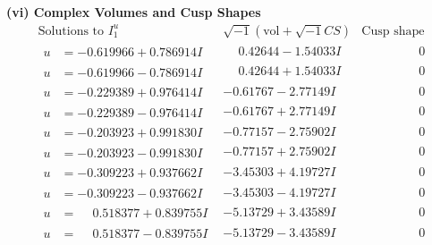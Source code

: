 \documentclass[1p]{elsarticle_modified}
\theoremstyle{definition}
\newcommand{\I}{\sqrt{-1}}
\begin{document}
\newpage\flushleft \textbf{(vi) Complex Volumes and Cusp Shapes}
$$\begin{array}{c|c|c}  
\text{Solutions to }I^u_{1}& \I (\text{vol} + \sqrt{-1}CS) & \text{Cusp shape}\\
 \hline 
\begin{aligned}
u &= -0.619966 + 0.786914 I\end{aligned}
 & \phantom{-}0.42644 - 1.54033 I & \phantom{-0.000000 } 0 \\ \hline\begin{aligned}
u &= -0.619966 - 0.786914 I\end{aligned}
 & \phantom{-}0.42644 + 1.54033 I & \phantom{-0.000000 } 0 \\ \hline\begin{aligned}
u &= -0.229389 + 0.976414 I\end{aligned}
 & -0.61767 - 2.77149 I & \phantom{-0.000000 } 0 \\ \hline\begin{aligned}
u &= -0.229389 - 0.976414 I\end{aligned}
 & -0.61767 + 2.77149 I & \phantom{-0.000000 } 0 \\ \hline\begin{aligned}
u &= -0.203923 + 0.991830 I\end{aligned}
 & -0.77157 - 2.75902 I & \phantom{-0.000000 } 0 \\ \hline\begin{aligned}
u &= -0.203923 - 0.991830 I\end{aligned}
 & -0.77157 + 2.75902 I & \phantom{-0.000000 } 0 \\ \hline\begin{aligned}
u &= -0.309223 + 0.937662 I\end{aligned}
 & -3.45303 + 4.19727 I & \phantom{-0.000000 } 0 \\ \hline\begin{aligned}
u &= -0.309223 - 0.937662 I\end{aligned}
 & -3.45303 - 4.19727 I & \phantom{-0.000000 } 0 \\ \hline\begin{aligned}
u &= \phantom{-}0.518377 + 0.839755 I\end{aligned}
 & -5.13729 + 3.43589 I & \phantom{-0.000000 } 0 \\ \hline\begin{aligned}
u &= \phantom{-}0.518377 - 0.839755 I\end{aligned}
 & -5.13729 - 3.43589 I & \phantom{-0.000000 } 0 \\ \hline\begin{aligned}

\end{aligned}
\end{array}$$
\end{document}
